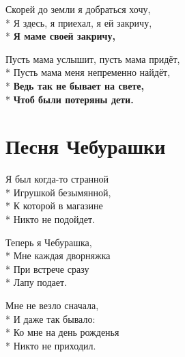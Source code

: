 \medskip

\begin{minipage}{\linewidth}
Скорей до земли я добраться хочу,\\*
Я здесь, я приехал, я ей закричу,\\*
\textbf{Я маме своей закричу,}\\
\end{minipage}\par\medskip\nobreak

\medskip

\begin{minipage}{\linewidth}
Пусть мама услышит, пусть мама придёт,\\*
Пусть мама меня непременно найдёт,\\*
\textbf{Ведь так не бывает на свете,}\\*
\textbf{Чтоб были потеряны дети.}\\
\end{minipage}

\vspace{\fill}\newpage

\section{Песня Чебурашки}
\label{song:Песня_Чебурашки}

\medskip

\begin{minipage}{\linewidth}
Я был когда-то странной\\*
Игрушкой безымянной,\\*
К которой в магазине\\*
Никто не подойдет.\\
\end{minipage}\par\medskip\nobreak

\medskip

\begin{minipage}{\linewidth}
Теперь я Чебурашка,\\*
Мне каждая дворняжка\\*
При встрече сразу\\*
Лапу подает.\\
\end{minipage}\par\medskip\nobreak

\medskip

\begin{minipage}{\linewidth}
Мне не везло сначала,\\*
И даже так бывало:\\*
Ко мне на день рожденья\\*
Никто не приходил.\\
\end{minipage}\par\medskip\nobreak

